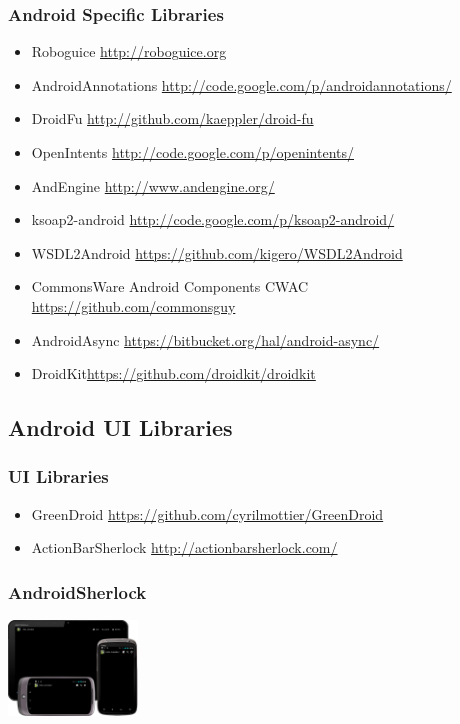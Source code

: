 \documentclass{beamer}
\begin{document}
    \begin{frame}
      \frametitle{Android Specific Libraries}
      \begin{itemize}
        \item<1->Roboguice \url{http://roboguice.org} 
        \item<2->AndroidAnnotations \url{http://code.google.com/p/androidannotations/}
        \item<3->DroidFu \url{http://github.com/kaeppler/droid-fu}
        \item<4->OpenIntents \url{http://code.google.com/p/openintents/}
        \item<5->AndEngine \url{http://www.andengine.org/}
        \item<6->ksoap2-android \url{http://code.google.com/p/ksoap2-android/}
        \item<7->WSDL2Android \url{https://github.com/kigero/WSDL2Android}
        \item<8->CommonsWare Android Components CWAC \url{https://github.com/commonsguy}  
        \item<9->AndroidAsync \url{https://bitbucket.org/hal/android-async/}  
        \item DroidKit\url{https://github.com/droidkit/droidkit}
\end{itemize}
    \end{frame}

  \subsection{Android UI Libraries}

    \begin{frame}
      \frametitle{UI Libraries}
      \begin{itemize}
       \item<1-> GreenDroid \url{https://github.com/cyrilmottier/GreenDroid}
       \item<2-> ActionBarSherlock \url{http://actionbarsherlock.com/} 
      \end{itemize}

    \end{frame}

    \begin{frame}
      \frametitle{AndroidSherlock}
      \begin{center}
      \includegraphics[height=1.0in]{androidsherlock.png}
      \end{center}
    \end{frame}
\end{document}
